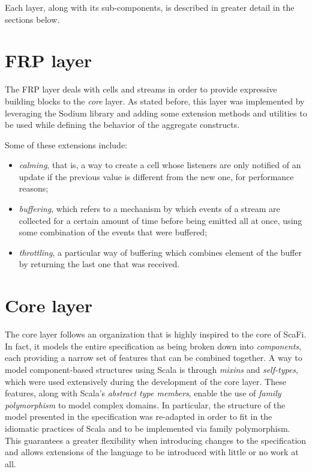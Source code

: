 Each layer, along with its sub-components, is described in greater detail in the sections below.

\section{FRP layer}

The FRP layer deals with cells and streams in order to provide expressive building blocks to the \textit{core} layer.
%
As stated before, this layer was implemented by leveraging the Sodium library and adding some extension methods and utilities to be used while defining the behavior of the aggregate constructs.

Some of these extensions include:
%
\begin{itemize}
    \item \textit{calming}, that is, a way to create a cell whose listeners are only notified of an update if the previous value is different from the new one, for performance reasons;
    \item \textit{buffering}, which refers to a mechanism by which events of a stream are collected for a certain amount of time before being emitted all at once, using some combination of the events that were buffered;
    \item \textit{throttling}, a particular way of buffering which combines element of the buffer by returning the last one that was received.
\end{itemize}


\section{Core layer}

The core layer follows an organization that is highly inspired to the core of ScaFi.
%
In fact, it models the entire specification as being broken down into \textit{components}, each providing a narrow set of features that can be combined together.
%
A way to model component-based structures using Scala is through \textit{mixins} and \textit{self-types}, which were used extensively during the development of the core layer.
%
These features, along with Scala's \textit{abstract type members}, enable the use of \textit{family polymorphism} \cite{10.1007/3-540-45337-7_17} to model complex domains.
%
In particular, the structure of the model presented in the specification was re-adapted in order to fit in the idiomatic practices of Scala and to be implemented via family polymorphism.
%
This guarantees a greater flexibility when introducing changes to the specification and allows extensions of the language to be introduced with little or no work at all.

